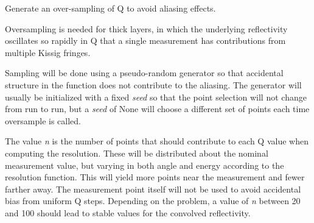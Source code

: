 \documentclass[letterpaper,10pt,english]{sphinxmanual}
\begin{document}
\begin{fulllineitems}
\begin{fulllineitems}
\end{fulllineitems}


\begin{fulllineitems}
\label{api/probe:refl1d.probe.PolarizedNeutronQProbe.mm}
\end{fulllineitems}


\begin{fulllineitems}
\label{api/probe:refl1d.probe.PolarizedNeutronQProbe.mp}
\end{fulllineitems}


\begin{fulllineitems}
\label{api/probe:refl1d.probe.PolarizedNeutronQProbe.name}
\end{fulllineitems}


\begin{fulllineitems}
\label{api/probe:refl1d.probe.PolarizedNeutronQProbe.oversample}
Generate an over-sampling of Q to avoid aliasing effects.

Oversampling is needed for thick layers, in which the underlying
reflectivity oscillates so rapidly in Q that a single measurement
has contributions from multiple Kissig fringes.

Sampling will be done using a pseudo-random generator so that
accidental structure in the function does not contribute to the
aliasing.  The generator will usually be initialized with a fixed
\emph{seed} so that the point selection will not change from run to run,
but a \emph{seed} of None will choose a different set of points each time
oversample is called.

The value \emph{n} is the number of points that should contribute to
each Q value when computing the resolution.   These will be
distributed about the nominal measurement value, but varying in
both angle and energy according to the resolution function.  This
will yield more points near the measurement and fewer farther away.
The measurement point itself will not be used to avoid accidental
bias from uniform Q steps.  Depending on the problem, a value of
\emph{n} between 20 and 100 should lead to stable values for the convolved
reflectivity.


\end{fulllineitems}
\end{fulllineitems}
\end{document}
